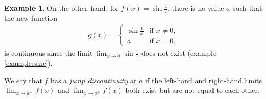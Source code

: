 \documentclass[11pt,oneside,reqno]{amsart}
\numberwithin{equation}{section}
\theoremstyle{definition}
\newtheorem{example}[theorem]{Example}
\theoremstyle{remark}
\begin{document}
\begin{example}
    On the other hand, for $f(x) = \sin\frac{1}{x}$, there is no value $a$ such that the new function 
\begin{align*}
    g(x) = \begin{cases}
    \sin\frac{1}{x} & \text{if } x \neq 0,\\
    a & \text{if } x = 0,
\end{cases}
\end{align*}
is continuous since the limit $\lim_{x\to0} \sin\frac{1}{x}$ does not exist (example \ref{example:sine}).
\end{example}
We say that $f$ has a \textit{jump discontinuity} at $a$ if the left-hand and right-hand limits $\lim_{x\to a^-} f(x)$ and $\lim_{x\to a^+} f(x)$ both exist but are not equal to each other.
\end{document}
